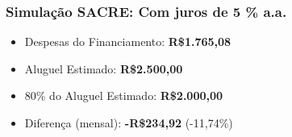 \begin{frame}[c]\frametitle{Simulação SACRE: Com juros de 5 \% a.a.}
  \begin{itemize}
    \item {Despesas do Financiamento:} \textbf{R\$1.765,08}
    \item {Aluguel Estimado:} \textbf{R\$2.500,00}
    \item {80\% do Aluguel Estimado:} \textbf{R\$2.000,00}
    \item {Diferença (mensal):} \textbf{-R\$234,92} (-11,74\%)
  \end{itemize}
\end{frame}